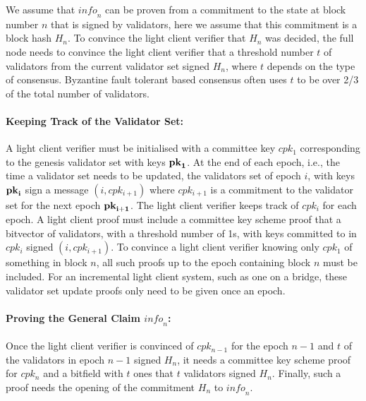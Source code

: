 We assume that $\mathit{info}_n$ can be proven from a commitment to the state at block number $n$ that is signed by validators, here we assume that this commitment is a block hash $H_n$. To convince the light client verifier that $H_n$  was decided, the full node needs to convince the light client verifier that a threshold number $t$ of validators from the current validator set signed $H_n$, where $t$ depends on the type of consensus. Byzantine fault tolerant based consensus often uses $t$ to be over 2/3 of the total number of validators.

\noindent\paragraph{Keeping Track of the Validator Set:} A light client verifier must be initialised with a committee key $cpk_1$ corresponding to the genesis validator set with keys $\bf{pk}_1$. At the end of each epoch, i.e., the time a validator set needs to be updated, the validators set of epoch $i$, with keys $\bf{pk}_i$ sign a message $(i,cpk_{i+1})$ where $cpk_{i+1}$ is {\color{red} a commitment to the validator set} for the next epoch $\bf{pk}_{i+1}$. The light client verifier keeps track of $cpk_i$ for each epoch. A light client proof must include a committee key scheme proof that a bitvector of validators, with a threshold number of 1s, with keys committed to in $cpk_i$ signed $(i,cpk_{i+1})$. To convince a light client verifier knowing only $cpk_1$ of something in block $n$, all such proofs up to the epoch containing block $n$ must be included. For an incremental light client system, such as one on a bridge, these validator set update proofs only need to be given once an epoch.
\vspace{-0.05in}

\noindent\paragraph{Proving the General Claim $\mathit{info}_n$:} Once the light client verifier is convinced of $cpk_{n-1}$ for the epoch $n-1$ and $t$ of the validators in epoch $n-1$ signed $H_n$, it needs a committee key scheme proof for $cpk_n$ and a bitfield with $t$ ones that $t$ validators signed $H_n$. Finally, such a proof needs the opening of the commitment $H_n$ to $\mathit{info}_n$.
\vspace{-0.08in}

